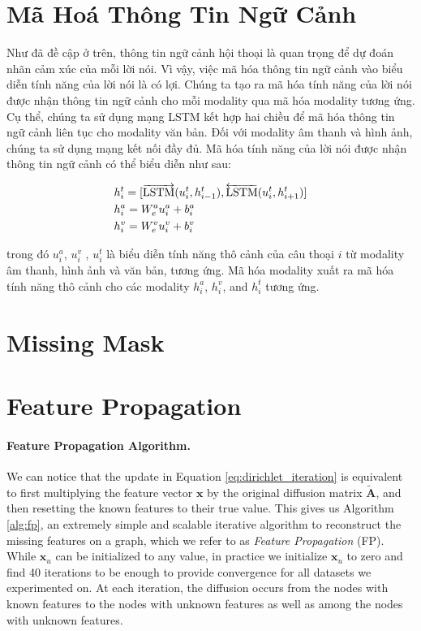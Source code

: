 \section{Mã Hoá Thông Tin Ngữ Cảnh} 

Như đã đề cập ở trên, thông tin ngữ cảnh hội thoại là quan trọng để dự đoán nhãn cảm xúc của mỗi lời nói. Vì vậy, việc mã hóa thông tin ngữ cảnh vào biểu diễn tính năng của lời nói là có lợi. Chúng ta tạo ra mã hóa tính năng của lời nói được nhận thông tin ngữ cảnh cho mỗi modality qua mã hóa modality tương ứng. Cụ thể, chúng ta sử dụng mạng LSTM kết hợp hai chiều để mã hóa thông tin ngữ cảnh liên tục cho modality văn bản. Đối với modality âm thanh và hình ảnh, chúng ta sử dụng mạng kết nối đầy đủ. Mã hóa tính năng của lời nói được nhận thông tin ngữ cảnh có thể biểu diễn như sau:

\begin{small}
\begin{equation}
\begin{aligned}
    \centering
    &h_{i}^t = [\overrightarrow{\mathrm{LSTM}}(u_{i}^t,h_{i-1}^t),\overleftarrow{\mathrm{LSTM}}(u_{i}^t,h_{i+1}^t)] \\
    &h_{i}^a = W_{e}^a u_{i}^a+b_{i}^a \\
    &h_{i}^v = W_{e}^v u_{i}^v+b_{i}^v
\end{aligned}
\end{equation}
\end{small}
trong đó $u_{i}^a$, $u_{i}^v$ , $u_{i}^t$  là biểu diễn tính năng thô cảnh của câu thoại $i$ từ modality âm thanh, hình ảnh và văn bản, tương ứng. Mã hóa modality xuất ra mã hóa tính năng thô cảnh cho các modality $h_{i}^a$, $h_{i}^v$, and $h_{i}^t$ tương ứng.




\section*{Missing Mask}

\section*{Feature Propagation}

\paragraph{Feature Propagation Algorithm.}
We can notice that the update in Equation \ref{eq:dirichlet_iteration} is equivalent to first multiplying the feature vector $\mathbf{x}$ by the original diffusion matrix $\tilde{\mathbf{A}}$, and then resetting the known features to their true value. This gives us Algorithm \ref{alg:fp}, an extremely simple and scalable iterative algorithm to reconstruct the missing features on a graph, which we refer to as {\em Feature Propagation} (FP). While $\mathbf{x}_u$ can be initialized to any value, in practice we initialize $\mathbf{x}_u$ to zero and find 40 iterations to be enough to provide convergence for all datasets we experimented on. At each iteration, the diffusion occurs from the nodes with known features to the nodes with unknown features as well as among the nodes with unknown features. 

